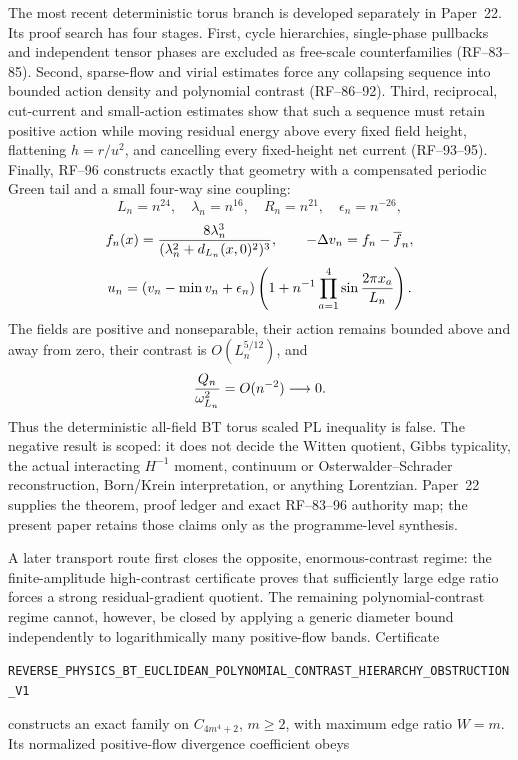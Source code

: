 \documentclass[11pt]{article}
\theoremstyle{definition}
\theoremstyle{remark}
\newcommand{\cert}[1]{\nolinkurl{#1}}
\begin{document}
The most recent deterministic torus branch is developed separately in
Paper~22.  Its proof search has four stages.  First, cycle hierarchies,
single-phase pullbacks and independent tensor phases are excluded as
free-scale counterfamilies (RF--83--85).  Second, sparse-flow and virial
estimates force any collapsing sequence into bounded action density and
polynomial contrast (RF--86--92).  Third, reciprocal, cut-current and
small-action estimates show that such a sequence must retain positive action
while moving residual energy above every fixed field height, flattening
\(h=r/u^2\), and cancelling every fixed-height net current (RF--93--95).
Finally, RF--96 constructs exactly that geometry with a compensated periodic
Green tail and a small four-way sine coupling:
\[
 L_n=n^{24},\quad \lambda_n=n^{16},\quad R_n=n^{21},\quad
 \epsilon_n=n^{-26},
\]
\[
 f_n(x)={8\lambda_n^3\over(\lambda_n^2+d_{L_n}(x,0)^2)^3},
 \qquad -\Delta v_n=f_n-\overline f_n,
\]
\[
 u_n=(v_n-\min v_n+\epsilon_n)
 \left(1+n^{-1}\prod_{a=1}^4\sin{2\pi x_a\over L_n}\right).
\]
The fields are positive and nonseparable, their action remains bounded above
and away from zero, their contrast is \(O(L_n^{5/12})\), and
\[
 {Q_n\over\omega_{L_n}^2}=O(n^{-2})\longrightarrow0.
\]
Thus the deterministic all-field BT torus scaled PL inequality is false.  The
negative result is scoped: it does not decide the Witten quotient, Gibbs
typicality, the actual interacting \(H^{-1}\) moment, continuum or
Osterwalder--Schrader reconstruction, Born/Krein interpretation, or anything
Lorentzian.  Paper~22 supplies the theorem, proof ledger and exact
RF--83--96 authority map; the present paper retains those claims only as the
programme-level synthesis.

\iffalse
A later transport route first closes the opposite, enormous-contrast regime:
the finite-amplitude high-contrast certificate proves that sufficiently large
edge ratio forces a strong residual-gradient quotient.  The remaining
polynomial-contrast regime cannot, however, be closed by applying a generic
diameter bound independently to logarithmically many positive-flow bands.
Certificate

\cert{REVERSE_PHYSICS_BT_EUCLIDEAN_POLYNOMIAL_CONTRAST_HIERARCHY_OBSTRUCTION_V1}

constructs an exact family on \(C_{4m^4+2}\), \(m\geq2\), with maximum edge
ratio \(W=m\).  Its normalized positive-flow divergence coefficient obeys
\end{document}
